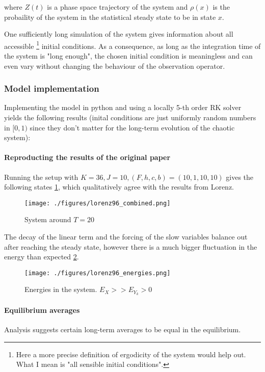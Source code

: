 \documentclass[11pt]{article}
\begin{document}
where \(Z(t)\) is a phase space trajectory of the system and \(\rho(x)\) is the probaility of the
system in the statistical steady state to be in state \(x\).

One sufficiently long simulation of the system gives information about all accessible \footnote{Here a more precise definition of ergodicity of the system would help out. What I mean
is "all sensible initial conditions".} initial conditions.
As a consequence, as long as the integration time of the system is "long enough", the chosen initial
condition is meaningless and can even vary without changing the behaviour of the observation operator.

\subsubsection{Model implementation}
\label{sec:org147e1bd}

Implementing the model in python and using a locally 5-th order RK solver yields the following
results (inital conditions are just uniformly random numbers in \([0,1)\) since they don't matter
for the long-term evolution of the chaotic system):

\paragraph{Reproducting the results of the original paper}
\label{sec:org7a22474}
Running the setup with \(K=36, J=10, (F, h, c, b) = (10, 1, 10, 10)\) gives the following states
\ref{fig:lorenz96_combined},
which qualitatively agree with the results from Lorenz.

\begin{figure}[htbp]
\centering
\texttt{[image: ./figures/lorenz96\_combined.png]}
\caption{\label{fig:lorenz96_combined}
System around \(T=20\)}
\end{figure}

The decay of the linear term and the forcing of the slow variables balance out after reaching the
steady state, however there is a much bigger fluctuation in the energy than expected \ref{fig:lorenz_energy}.

\begin{figure}[htbp]
\centering
\texttt{[image: ./figures/lorenz96\_energies.png]}
\caption{\label{fig:lorenz_energy}
Energies in the system. \(E_X >> E_{Y_k} > 0\)}
\end{figure}

\paragraph{Equilibrium averages}
\label{sec:org35246ac}
Analysis suggests certain long-term averages to be equal in the equilibrium.
\end{document}
